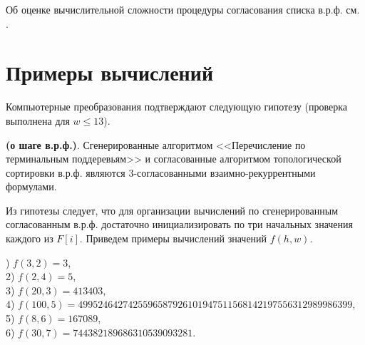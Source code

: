 Об оценке вычислительной сложности процедуры согласования списка в.р.ф. см. \cite{akm_17}.







\section{
Примеры вычислений %
}

Компьютерные преобразования подтверждают следующую гипотезу (проверка выполнена для $w\leq 13$).

\begin{hypothesis}
\textbf{ (о шаге в.р.ф.)}. Сгенерированные алгоритмом <<Перечисление по терминальным поддеревьям>> и согласованные алгоритмом топологической сортировки в.р.ф. являются $3$-согласованными взаимно-рекуррентными формулами.
\end{hypothesis}

Из гипотезы следует, что для организации вычислений по сгенерированным согласованным в.р.ф. достаточно инициализировать по три начальных значения каждого из $F[i]$.  Приведем примеры вычислений значений $f(h,w)$.
\par\smallskip
{\small
{}) $f(3,2)=3$,\\
2) $f(2,4) = 5$,\\
3) $f(20,3)=413403$,\\
4) $f(100,5)=4995246427425596587926101947511568142197556312989986399$, \\
5) $f(8,6)=167089$,\\
6) $f(30,7) = 744382189686310539093281$.
} 
